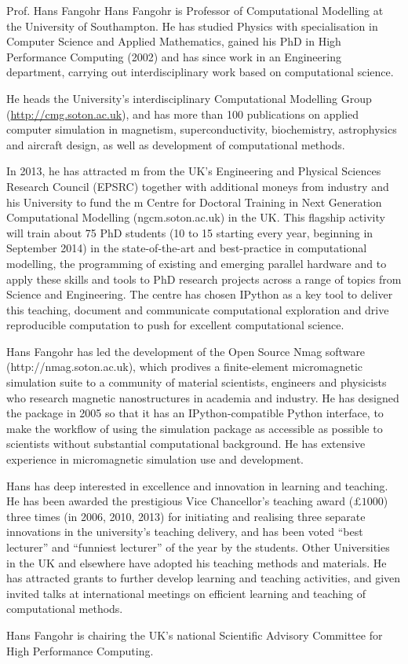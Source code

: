 \begin{participant}{Prof. Hans Fangohr}
  Hans Fangohr is Professor of Computational Modelling at the University of
  Southampton. He has studied Physics with specialisation in Computer Science and Applied
  Mathematics, gained his PhD in High Performance Computing (2002) and has since work in
  an Engineering department, carrying out interdisciplinary work based on computational
  science.

  He heads the University's interdisciplinary Computational Modelling Group
  (\url{http://cmg.soton.ac.uk}), and has more than 100 publications on applied computer
  simulation in magnetism, superconductivity, biochemistry, astrophysics and aircraft
  design, as well as development of computational methods.


  In 2013, he has attracted m from the UK's Engineering and Physical Sciences
  Research Council (EPSRC) together with additional moneys from industry and his
  University to fund the m Centre for Doctoral Training in Next Generation
  Computational Modelling (ngcm.soton.ac.uk) in the UK. This flagship activity will train
  about 75 PhD students (10 to 15 starting every year, beginning in September 2014) in the
  state-of-the-art and best-practice in computational modelling, the programming of
  existing and emerging parallel hardware and to apply these skills and tools to PhD
  research projects across a range of topics from Science and Engineering. The centre has
  chosen IPython as a key tool to deliver this teaching, document and communicate
  computational exploration and drive reproducible computation to push for excellent
  computational science.

  Hans Fangohr has led the development of the Open Source Nmag software
  (http://nmag.soton.ac.uk), which prodives a finite-element micromagnetic simulation
  suite to a community of material scientists, engineers and physicists who research
  magnetic nanostructures in academia and industry. He has designed the package in 2005 so
  that it has an IPython-compatible Python interface, to make the workflow of using the
  simulation package as accessible as possible to scientists without substantial
  computational background. He has extensive experience in micromagnetic simulation use
  and development.

  Hans has deep interested in excellence and innovation in learning and teaching. He has
  been awarded the prestigious Vice Chancellor’s teaching award ($\pounds 1000$) three
  times (in 2006, 2010, 2013) for initiating and realising three separate innovations in
  the university's teaching delivery, and has been voted ``best lecturer'' and ``funniest
  lecturer'' of the year by the students. Other Universities in the UK and elsewhere have
  adopted his teaching methods and materials. He has attracted grants to further develop
  learning and teaching activities, and given invited talks at international meetings on
  efficient learning and teaching of computational methods.
 
  Hans Fangohr is chairing the UK's national Scientific Advisory Committee for High
  Performance Computing.
\end{participant}


